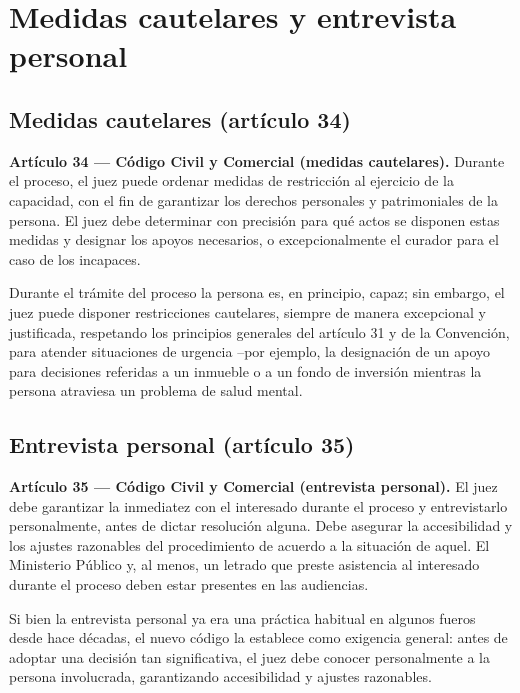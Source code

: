 \documentclass[12pt,oneside]{book}
\begin{document}
\section{Medidas cautelares y entrevista personal}

\subsection{Medidas cautelares (artículo 34)}

\begin{important}
\textbf{Artículo 34 --- Código Civil y Comercial (medidas cautelares).} Durante el proceso, el juez puede ordenar medidas de restricción al ejercicio de la capacidad, con el fin de garantizar los derechos personales y patrimoniales de la persona. El juez debe determinar con precisión para qué actos se disponen estas medidas y designar los apoyos necesarios, o excepcionalmente el curador para el caso de los incapaces.
\end{important}

Durante el trámite del proceso la persona es, en principio, capaz; sin embargo, el juez puede disponer restricciones cautelares, siempre de manera excepcional y justificada, respetando los principios generales del artículo 31 y de la Convención, para atender situaciones de urgencia --por ejemplo, la designación de un apoyo para decisiones referidas a un inmueble o a un fondo de inversión mientras la persona atraviesa un problema de salud mental.

\subsection{Entrevista personal (artículo 35)}

\begin{important}
\textbf{Artículo 35 --- Código Civil y Comercial (entrevista personal).} El juez debe garantizar la inmediatez con el interesado durante el proceso y entrevistarlo personalmente, antes de dictar resolución alguna. Debe asegurar la accesibilidad y los ajustes razonables del procedimiento de acuerdo a la situación de aquel. El Ministerio Público y, al menos, un letrado que preste asistencia al interesado durante el proceso deben estar presentes en las audiencias.
\end{important}

Si bien la entrevista personal ya era una práctica habitual en algunos fueros desde hace décadas, el nuevo código la establece como exigencia general: antes de adoptar una decisión tan significativa, el juez debe conocer personalmente a la persona involucrada, garantizando accesibilidad y ajustes razonables.
\end{document}
